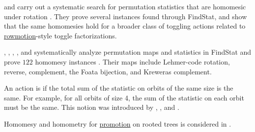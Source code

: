  and  carry out a systematic search
for permutation statistics that are homomesic under rotation
\cite{DowlingLafreniere2025}.  They prove several instances found through
FindStat, and show that the same homomesies hold for a broader class of
toggling actions related to \hyperref[rowmotion]{rowmotion}-style toggle
factorizations.

, , ,
, and  systematically analyze
permutation maps and statistics in FindStat and prove $122$ homomesy
instances \cite{ElderLafreniereMcNicholasStrikerWelch2024}.  Their maps
include Lehmer-code rotation, reverse, complement, the Foata bijection, and
Kreweras complement.


An action is  if the total sum of the statistic on orbits of the same size
is the same. For example, for all orbits of size 4, the sum of the statistic on each orbit must be the same.
This notion was introduced 
by , ,  and .

Homomesy and homometry for \hyperref[promotion]{promotion} on rooted trees is
considered in \cite{DangwalKimbleLiangLouSaganStewart2023}.
